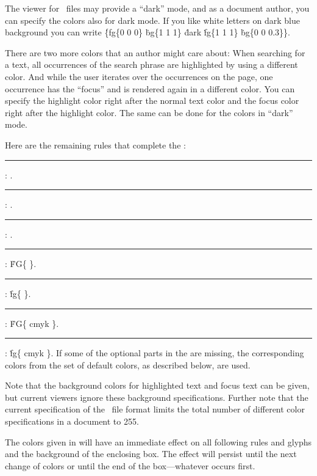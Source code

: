 The viewer for \HINT\ files may provide a ``dark'' mode, and as a document
author, you can specify the colors also for dark mode.
If you like white letters on dark blue background you can write
\.{\{fg\{0 0 0\}} \.{bg\{1 1 1\}}
\.{dark} \.{fg\{1 1 1\}} \.{bg\{0 0 0.3\}\}}.

There are two more colors that an author might care about: When searching
for a text, all occurrences of the search phrase are highlighted by
using a different color. And while the user iterates over the occurrences
on the page, one occurrence has the ``focus'' and is rendered again in a
different color. You can specify the highlight color right after
the normal text color and the focus color right after the highlight color.
The same can be done for the colors in ``dark'' mode.

Here are the remaining rules that complete the :

\medskip
\rule{}:  .
\rule{}:
     .
\rule{}:
     .
\rule{}:
   \.{FG\{      \}}.
\rule{}:
   \.{fg\{      \}}.
\rule{}:
   \.{FG\{ cmyk      \}}.
\rule{}:
  \.{fg\{ cmyk      \}}.
\medskip
If some of the optional parts in the  are missing,
the corresponding colors from the set of default colors, as described below,
are used.

Note that the background colors for highlighted text and focus text
can be given, but current viewers ignore these background specifications.
Further note that the current specification of the \HINT\ file format
limits the total number of different color specifications in a document to 255.


The colors given in  will have an immediate effect
on all following rules and glyphs and the background of the enclosing box.
The effect will persist until the next change of colors or until
the end of the box---whatever occurs first.

